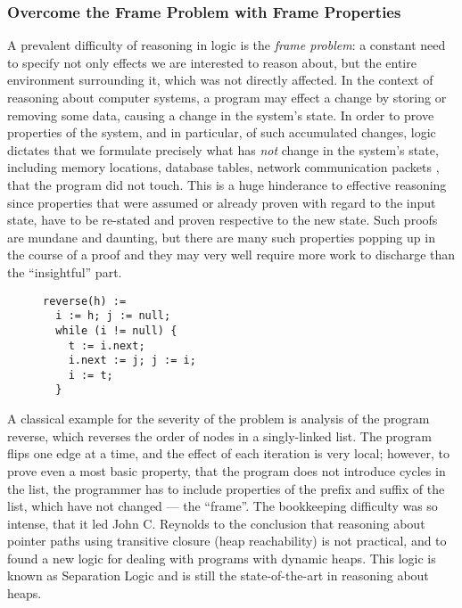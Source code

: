 \subsubsection{Overcome the Frame Problem with Frame Properties}

A prevalent difficulty of reasoning in logic is the \emph{frame problem}:
a constant need to specify not only effects we are interested to reason about,
but the entire environment surrounding it, which was not directly affected.
In the context of reasoning about computer systems, a program may effect a change
by storing or removing some data, causing a change in the system's state.
In order to prove properties of the system, and in particular, of such
accumulated changes, logic dictates that we formulate precisely what has
\emph{not} change in the system's state, including memory locations, database
tables, network communication packets \etc, that the program did not touch.
This is a huge hinderance to effective reasoning since properties that were
assumed or already proven with regard to the input state, have to be
re-stated and proven respective to the new state.
Such proofs are mundane and daunting, but there are many such properties
popping up in the course of a proof and they may very well require more work to
discharge than the ``insightful'' part.

\begin{figure}
\begin{lstlisting}
reverse(h) :=
  i := h; j := null;
  while (i != null) {
    t := i.next;
    i.next := j; j := i;
    i := t;
  }
\end{lstlisting}
\end{figure}

A classical example for the severity of the problem is analysis of the program
\textsf{reverse}, which reverses the order of nodes in a singly-linked list.
The program flips one edge at a time, and the effect of each iteration is
very local; however, to prove even a most basic property, that the program does
not introduce cycles in the list, the programmer has to include properties of
the prefix and suffix of the list, which have not changed --- the ``frame''.
The bookkeeping difficulty was so intense, that it led John C. Reynolds to the
conclusion that reasoning about pointer paths using transitive closure (heap
reachability) is not practical, and to found a new logic for dealing with
programs with dynamic heaps.
This logic is known as Separation Logic and is still the state-of-the-art in
reasoning about heaps.

